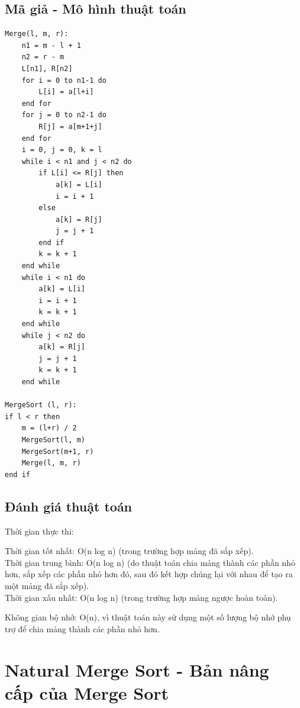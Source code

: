 \documentclass[12pt,a4paper]{report}
\begin{document}
\subsection{ Mã giả - Mô hình thuật toán}

\begin{lstlisting}
Merge(l, m, r):
    n1 = m - l + 1
    n2 = r - m
    L[n1], R[n2]
    for i = 0 to n1-1 do
        L[i] = a[l+i]
    end for
    for j = 0 to n2-1 do
        R[j] = a[m+1+j]
    end for
    i = 0, j = 0, k = l
    while i < n1 and j < n2 do
        if L[i] <= R[j] then
            a[k] = L[i]
            i = i + 1
        else
            a[k] = R[j]
            j = j + 1
        end if
        k = k + 1
    end while
    while i < n1 do
        a[k] = L[i]
        i = i + 1
        k = k + 1
    end while
    while j < n2 do
        a[k] = R[j]
        j = j + 1
        k = k + 1
    end while

MergeSort (l, r):
if l < r then
    m = (l+r) / 2
    MergeSort(l, m)
    MergeSort(m+1, r)
    Merge(l, m, r)
end if
\end{lstlisting}

\subsection{ Đánh giá thuật toán}

{Thời gian thực thi:

\hspace{0.5cm} Thời gian tốt nhất: O(n log n) (trong trường hợp mảng đã sắp xếp).\\

\hspace{0.5cm} Thời gian trung bình: O(n log n) (do thuật toán chia mảng thành các phần nhỏ hơn, sắp xếp các phần nhỏ hơn đó, sau đó kết hợp chúng lại với nhau để tạo ra một mảng đã sắp xếp).\\

\hspace{0.5cm} Thời gian xấu nhất: O(n log n) (trong trường hợp mảng ngược hoàn toàn).\\}

{Không gian bộ nhớ: O(n), vì thuật toán này sử dụng một số lượng bộ nhớ phụ trợ để chia mảng thành các phần nhỏ hơn.}

\section{ Natural Merge Sort - Bản nâng cấp của Merge Sort}
 
\end{document}
